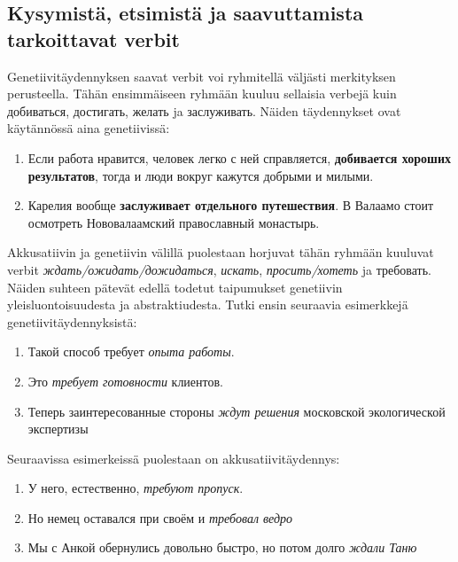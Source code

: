 \documentclass[]{scrreprt}
\providecommand{\tightlist}{%
  \setlength{\itemsep}{0pt}\setlength{\parskip}{0pt}}
\begin{document}
\subsection{Kysymistä, etsimistä ja saavuttamista tarkoittavat
verbit}\label{kysymistuxe4-etsimistuxe4-ja-saavuttamista-tarkoittavat-verbit}

Genetiivitäydennyksen saavat verbit voi ryhmitellä väljästi merkityksen
perusteella. Tähän ensimmäiseen ryhmään kuuluu sellaisia verbejä kuin
добиваться, достигать, желать ja заслуживать. Näiden täydennykset ovat
käytännössä aina genetiivissä:

\begin{enumerate}
\def\labelenumi{(\arabic{enumi})}
\setcounter{enumi}{47}
\item
  Если работа нравится, человек легко с ней справляется,
  \textbf{добивается хороших результатов}, тогда и люди вокруг кажутся
  добрыми и милыми.
\item
  Карелия вообще \textbf{заслуживает отдельного путешествия}. В Валаамо
  стоит осмотреть Нововалаамский православный монастырь.
\end{enumerate}

Akkusatiivin ja genetiivin välillä puolestaan horjuvat tähän ryhmään
kuuluvat verbit \emph{ждать/ожидать/дожидаться}, \emph{искать},
\emph{просить/хотеть} ja требовать. Näiden suhteen pätevät edellä
todetut taipumukset genetiivin yleisluontoisuudesta ja abstraktiudesta.
Tutki ensin seuraavia esimerkkejä genetiivitäydennyksistä:

\begin{enumerate}
\def\labelenumi{(\arabic{enumi})}
\setcounter{enumi}{49}
\tightlist
\item
  Такой способ требует \emph{опыта работы}.
\item
  Это \emph{требует готовности} клиентов.
\item
  Теперь заинтересованные стороны \emph{ждут решения} московской
  экологической экспертизы
\end{enumerate}

Seuraavissa esimerkeissä puolestaan on akkusatiivitäydennys:

\begin{enumerate}
\def\labelenumi{(\arabic{enumi})}
\setcounter{enumi}{52}
\tightlist
\item
  У него, естественно, \emph{требуют пропуск}.
\item
  Но немец оставался при своём и \emph{требовал ведро}
\item
  Мы с Анкой обернулись довольно быстро, но потом долго \emph{ждали
  Таню}
\end{enumerate}
\end{document}
